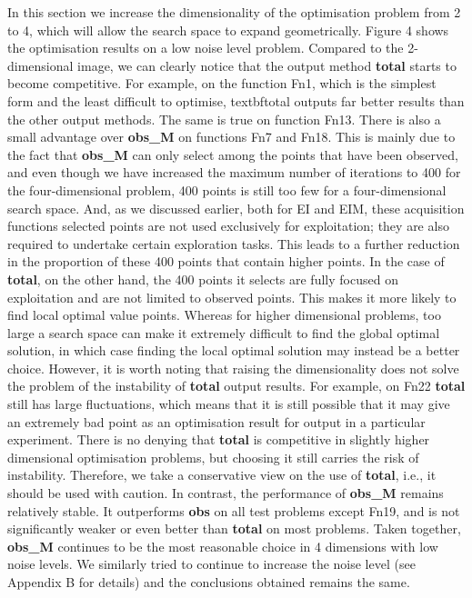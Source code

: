 \documentclass{article}
\begin{document}
\hspace{2em}In this section we increase the dimensionality of the optimisation problem from 2 to 4, which will allow the search space to expand geometrically. Figure 4 shows the optimisation results on a low noise level problem. Compared to the 2-dimensional image, we can clearly notice that the output method \textbf{total} starts to become competitive. For example, on the function Fn1, which is the simplest form and the least difficult to optimise, textbf{total} outputs far better results than the other output methods. The same is true on function Fn13. There is also a small advantage over \textbf{obs\_M} on functions Fn7 and Fn18. This is mainly due to the fact that \textbf{obs\_M} can only select among the points that have been observed, and even though we have increased the maximum number of iterations to 400 for the four-dimensional problem, 400 points is still too few for a four-dimensional search space. And, as we discussed earlier, both for EI and EIM, these acquisition functions selected points are not used exclusively for exploitation; they are also required to undertake certain exploration tasks. This leads to a further reduction in the proportion of these 400 points that contain higher points. In the case of \textbf{total}, on the other hand, the 400 points it selects are fully focused on exploitation and are not limited to observed points. This makes it more likely to find local optimal value points. Whereas for higher dimensional problems, too large a search space can make it extremely difficult to find the global optimal solution, in which case finding the local optimal solution may instead be a better choice. However, it is worth noting that raising the dimensionality does not solve the problem of the instability of \textbf{total} output results. For example, on Fn22 \textbf{total} still has large fluctuations, which means that it is still possible that it may give an extremely bad point as an optimisation result for output in a particular experiment. There is no denying that \textbf{total} is competitive in slightly higher dimensional optimisation problems, but choosing it still carries the risk of instability. Therefore, we take a conservative view on the use of \textbf{total}, i.e., it should be used with caution. In contrast, the performance of \textbf{obs\_M} remains relatively stable. It outperforms \textbf{obs} on all test problems except Fn19, and is not significantly weaker or even better than \textbf{total} on most problems. Taken together, \textbf{obs\_M} continues to be the most reasonable choice in 4 dimensions with low noise levels. We similarly tried to continue to increase the noise level (see Appendix B for details) and the conclusions obtained remains the same.
\end{document}
